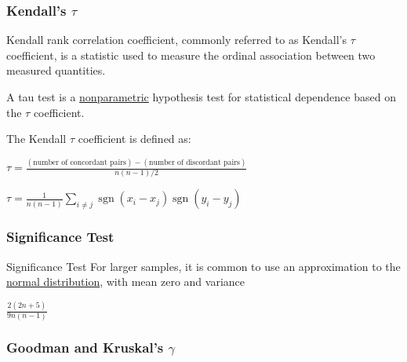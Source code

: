 \documentclass{beamer}
\begin{document}
\subsubsection{Kendall's $\tau$}

\begin{frame}
	Kendall rank correlation coefficient, commonly referred to as Kendall's $\tau$ coefficient, is a statistic used to measure the ordinal association between two measured quantities. \\ \vspace{1cm}
	
	A tau test is a \underline{nonparametric} hypothesis test for statistical dependence based on the $\tau$ coefficient.
\end{frame}

\begin{frame}
	The Kendall $\tau$ coefficient is defined as: \vspace{1cm}
\begin{center}
$\tau ={\frac {({\text{number of concordant pairs}})-({\text{number of discordant pairs}})}{n(n-1)/2}}$ \end{center}
\vspace{1cm}

\begin{center} $\tau ={\frac {1}{n(n-1)}}\sum _{i\not =j}\operatorname {sgn}(x_{i}-x_{j})\operatorname {sgn}(y_{i}-y_{j}) $
\end{center}

\end{frame}

\subsubsection{Significance Test}
\begin{frame}{Significance Test}
	 For larger samples, it is common to use an approximation to the \underline{normal distribution}, with mean zero and variance
\vspace{1cm}
\begin{center}
$\frac {2(2n+5)}{9n(n-1)}$	
\end{center}

\end{frame}


\subsubsection{Goodman and Kruskal's $\gamma$}
\end{document}
